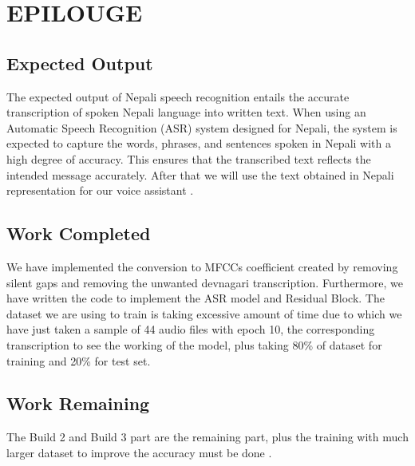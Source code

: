 \chapter{EPILOUGE}

\section{Expected Output}
The expected output of Nepali speech recognition entails the accurate transcription of spoken Nepali language into written text. When using an Automatic Speech Recognition (ASR) system designed for Nepali, the system is expected to capture the words, phrases, and sentences spoken in Nepali with a high degree of accuracy. This ensures that the transcribed text reflects the intended message accurately. After that we will use the text obtained in Nepali representation for our voice assistant .

\section{Work Completed}
We have implemented the conversion to MFCCs coefficient created by removing silent gaps and removing the unwanted devnagari transcription. Furthermore, we have written the code to implement the ASR model and Residual Block. The dataset we are using to train is taking excessive amount of time due to which we have just taken a sample of 44 audio files with epoch 10, the corresponding transcription to see the working of the model, plus taking 80\% of dataset for training and 20\% for test set.  

\section{Work Remaining}
The Build 2 and Build 3 part are the remaining part, plus the training with much larger dataset to improve the accuracy must be done .






\newpage
\renewcommand\bibname{REFERENCES} %










	

